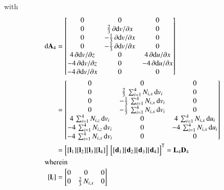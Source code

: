 with  
\begin{subequations}
	\begin{align}
		\mathrm{d} \mathbf{A}_4 & =  \begin{bmatrix}
			0 & 0 &  0   \\
			0 &  \tfrac{2}{3} \, \partial \mathrm{d} v / \partial x & 0  \\
			0 &  - \tfrac{1}{3} \, \partial \mathrm{d} v / \partial x & 0 \\
			0 &  - \tfrac{1}{3} \, \partial \mathrm{d} v / \partial x & 0 \\
			4 \, \partial \mathrm{d} v / \partial z &  0 & 4 \, \partial \mathrm{d} u / \partial x  \\
			-4 \, \partial \mathrm{d} v / \partial z &  0 & -4 \, \partial \mathrm{d} u / \partial x  \\
			-4 \, \partial \mathrm{d} v / \partial x &  0 & 0  \end{bmatrix} \notag\\
		& = \begin{bmatrix}
			0 &  0 &  0  \\
			0 &  \tfrac{2}{3} \, \sum\nolimits_{i=1}^4 N_{i,x} \, \mathrm{d} v_i & 0  \\
			0 &  - \tfrac{1}{3} \, \sum\nolimits_{i=1}^4 N_{i,x} \, \mathrm{d} v_i & 0  \\
			0 &  - \tfrac{1}{3} \, \sum\nolimits_{i=1}^4 N_{i,x} \, \mathrm{d} v_i & 0  \\
			4 \, \sum\nolimits_{i=1}^4 N_{i,z} \, \mathrm{d} v_i &  0 & 4 \, \sum\nolimits_{i=1}^4 N_{i,x} \, \mathrm{d} u_i  \\
			-4 \, \sum\nolimits_{i=1}^4 N_{i,z} \, \mathrm{d} v_i &  0 & - 4 \, \sum\nolimits_{i=1}^4 N_{i,x} \, \mathrm{d} u_i  \\
			- 4 \, \sum\nolimits_{i=1}^4 N_{i,x} \, \mathrm{d} v_i &  0 & 0  \end{bmatrix} \notag \\	
		& = \begin{bmatrix}
			[\mathbf{l}_1] [\mathbf{l}_2] [\mathbf{l}_3] [\mathbf{l}_4] 
		\end{bmatrix}  \, \begin{bmatrix} [\mathbf{d}_1] [\mathbf{d}_2] [\mathbf{d}_3] [\mathbf{d}_4] \end{bmatrix}^{\mathsf{T}}
	= \mathbf{L}_4 \mathbf{D}_4 \\
		\intertext{wherein}
		[\mathbf{l}_i] & = \begin{bmatrix}
			0 &  0 &  0  \\
			0 &  \tfrac{2}{3} \, N_{i,x}  & 0  \\

\end{bmatrix}
\end{align}
\end{subequations}
